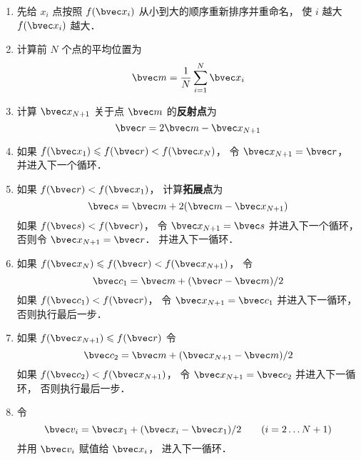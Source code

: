 \begin{enumerate}
\item 先给 $x_i$ 点按照 $f(\bvec x_i)$ 从小到大的顺序重新排序并重命名， 使 $i$ 越大 $f(\bvec x_i)$ 越大．

\item 计算前 $N$ 个点的平均位置为
\begin{equation}
\bvec m = \frac1N \sum_{i=1}^N \bvec x_i
\end{equation}

\item 计算 $\bvec x_{N + 1}$ 关于点 $\bvec m$ 的\textbf{反射点}为
\begin{equation}
\bvec r = 2\bvec m - \bvec x_{N + 1}
\end{equation}

\item 如果 $f(\bvec x_1) \leqslant f(\bvec r) < f(\bvec x_N)$， 令 $\bvec x_{N+1} = \bvec r$， 并进入下一个循环．

\item 如果 $f(\bvec r) < f(\bvec x_1)$， 计算\textbf{拓展点}为
\begin{equation}
\bvec s = \bvec m + 2(\bvec m - \bvec x_{N+1})
\end{equation}
如果 $f(\bvec s) < f(\bvec r)$， 令 $\bvec x_{N+1} = \bvec s$ 并进入下一个循环， 否则令 $\bvec x_{N+1} = \bvec r$． 并进入下一循环．

\item 如果 $f(\bvec x_N) \leqslant f(\bvec r) < f(\bvec x_{N+1})$， 令
\begin{equation}
\bvec c_1 = \bvec m + (\bvec r - \bvec m)/2
\end{equation}
如果 $f(\bvec c_1) < f(\bvec r)$， 令 $\bvec x_{N + 1} = \bvec c_1$ 并进入下一循环， 否则执行最后一步．

\item 如果 $f(\bvec x_{N+1}) \leqslant f(\bvec r)$ 令
\begin{equation}
\bvec c_2 = \bvec m + (\bvec x_{N+1} - \bvec m)/2
\end{equation}
如果 $f(\bvec c_2) < f(\bvec x_{N+1})$， 令 $\bvec x_{N+1}  = \bvec c_2$ 并进入下一循环， 否则执行最后一步．

\item 令
\begin{equation}
\bvec v_i = \bvec x_1 + (\bvec x_i - \bvec x_1)/2 \qquad (i = 2\dots N+1)
\end{equation}
并用 $\bvec v_i$ 赋值给 $\bvec x_i$， 进入下一循环．
\end{enumerate}

